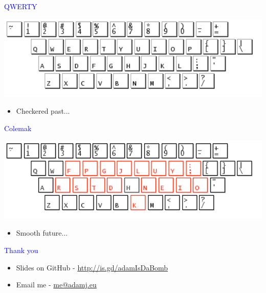 \documentclass[landscape]{slides}
\begin{document}
\begin{slide}

    \textcolor{blue}{\Large{QWERTY}}

    \centering
    \includegraphics[width=20cm]{qwerty}

    \begin{itemize}
        \item Checkered past...
    \end{itemize}

\end{slide}


\begin{slide}

    \textcolor{blue}{\Large{Colemak}}

    \centering
    \includegraphics[width=20cm]{colemak-annot}

    \begin{itemize}
        \item Smooth future...
    \end{itemize}

\end{slide}


\begin{slide}
    \textcolor{blue}{\Large{Thank you}}

    \begin{itemize}
        \item Slides on GitHub - \url{http://is.gd/adamIsDaBomb}
        \item Email me - \url{me@adamj.eu}
    \end{itemize}

\end{slide}
\end{document}
